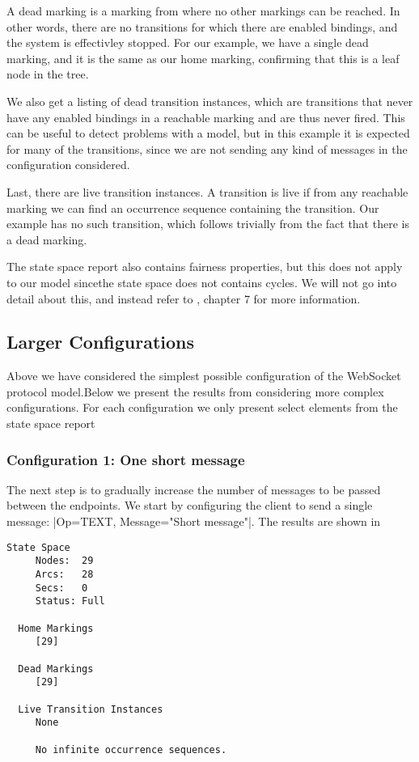 	A dead marking is a marking from where no other markings can be reached.
	 In other words, there are no transitions
	for which there are enabled bindings, and the system is effectivley stopped.
	For our example, we have a single dead marking, and it is the same as our home
	marking, confirming that this is a leaf node in the tree.
	
	We also get a listing of dead transition instances, which are transitions that
	never have any enabled bindings in a reachable marking and are thus never
	fired. This can be useful to detect problems with a model, but in this example
	it is expected for many of the transitions, since we are not sending any kind
	of messages in the configuration considered.
	
	Last, there are live transition instances. A transition is live if from any
	reachable marking we can find an occurrence sequence containing the transition.
	Our example has no such transition, which follows trivially from the fact that
	there is a dead marking.

	The state space report also contains fairness properties, but this does
	not apply to our model sincethe state space does not contains cycles. We
	will not go into detail about this, and instead refer to \cite{cpn_book},
	chapter 7 for more information.
	
\subsection{Larger Configurations} 
	Above we have considered the simplest possible configuration of the WebSocket
	protocol model.Below we present the results from considering more complex
	configurations. For each configuration we only present select elements from the
	state space report

	\subsubsection{Configuration 1: One short message}
	The next step is to gradually increase the number of messages to be passed
	between the endpoints. We start by configuring the client to send a single
	message: |{Op=TEXT, Message="Short message"}|. The results are shown in
	
	\begin{lstlisting}[language={},float,label=lst:ssa_one_msg,caption=One message]
  State Space
     Nodes:  29
     Arcs:   28
     Secs:   0
     Status: Full

  Home Markings
     [29]

  Dead Markings
     [29]

  Live Transition Instances
     None

     No infinite occurrence sequences.
	\end{lstlisting}
	
